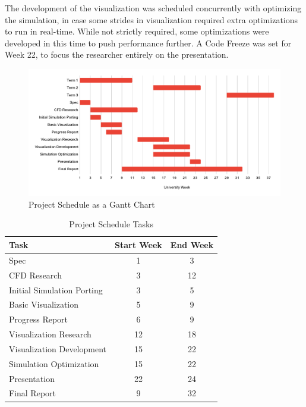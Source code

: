 The development of the visualization was scheduled concurrently with optimizing the simulation, in case some strides in visualization required extra optimizations to run in real-time.
While not strictly required, some optimizations were developed in this time to push performance further.
A Code Freeze was set for Week 22, to focus the researcher entirely on the presentation.

\begin{figure}[ht]
    \centering
    \includegraphics[width=\linewidth]{Ch50ProjectManagement/cs311_gantt_chart.svg.pdf}
    \caption{Project Schedule as a Gantt Chart}
    \label{fig:project schedule gantt}
\end{figure}

\begin{table}[ht]
    \centering
    \begin{tabular}{l|c|c}
    \textbf{Task} & \textbf{Start Week} & \textbf{End Week} \\
    \hline
    Spec & 1 & 3 \\
    CFD Research & 3 & 12 \\
    Initial Simulation Porting & 3 & 5 \\
    Basic Visualization & 5 & 9 \\
    Progress Report & 6 & 9 \\
    Visualization Research & 12 & 18 \\
    Visualization Development & 15 & 22 \\
    Simulation Optimization & 15 & 22 \\
    Presentation & 22 & 24 \\
    Final Report & 9 & 32 \\
    \end{tabular}
    \caption{Project Schedule Tasks}
    \label{tab:project schedule table}
\end{table}

